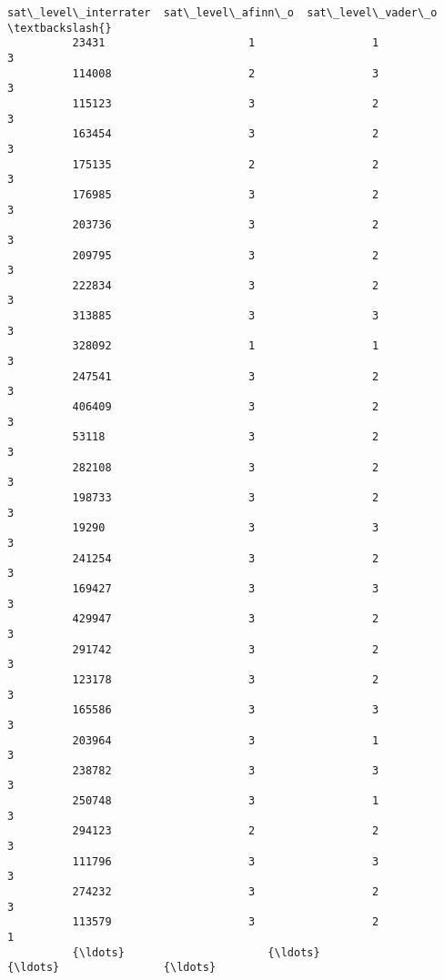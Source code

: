 \documentclass[11pt]{article}
\begin{document}
\begin{Verbatim}[commandchars=\\\{\}]
                  sat\_level\_interrater  sat\_level\_afinn\_o  sat\_level\_vader\_o  \textbackslash{}
          23431                      1                  1                  3   
          114008                     2                  3                  3   
          115123                     3                  2                  3   
          163454                     3                  2                  3   
          175135                     2                  2                  3   
          176985                     3                  2                  3   
          203736                     3                  2                  3   
          209795                     3                  2                  3   
          222834                     3                  2                  3   
          313885                     3                  3                  3   
          328092                     1                  1                  3   
          247541                     3                  2                  3   
          406409                     3                  2                  3   
          53118                      3                  2                  3   
          282108                     3                  2                  3   
          198733                     3                  2                  3   
          19290                      3                  3                  3   
          241254                     3                  2                  3   
          169427                     3                  3                  3   
          429947                     3                  2                  3   
          291742                     3                  2                  3   
          123178                     3                  2                  3   
          165586                     3                  3                  3   
          203964                     3                  1                  3   
          238782                     3                  3                  3   
          250748                     3                  1                  3   
          294123                     2                  2                  3   
          111796                     3                  3                  3   
          274232                     3                  2                  3   
          113579                     3                  2                  1   
          {\ldots}                      {\ldots}                {\ldots}                {\ldots}   

\end{Verbatim}
\end{document}
